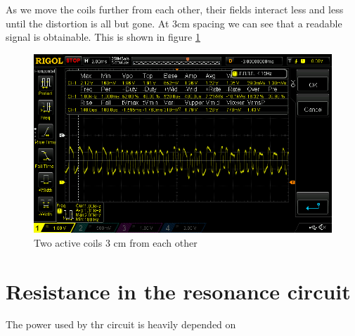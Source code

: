 As we move the coils further from each other, their fields interact less and less until the distortion is all but gone. At 3cm spacing we can see that a readable signal is obtainable. This is shown in figure \ref{fig:06:3cmAppart}

\begin{figure}[H]
    \centering
    \includegraphics[width=\textwidth]{06_My_Testing_Results/figures/Several_readers_close/3_cm_spacing.png}
    \caption{Two active coils 3 cm from each other}
    \label{fig:06:3cmAppart}
\end{figure}







\section{Resistance in the resonance circuit}
The power used by thr circuit is heavily depended on 

